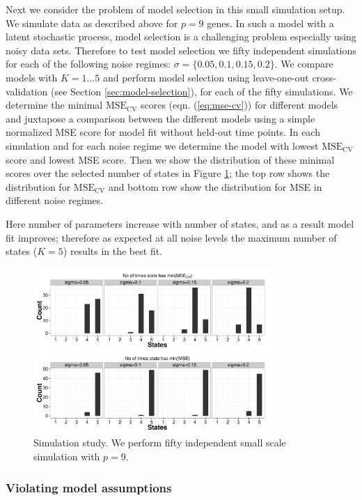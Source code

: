 Next we consider the problem of model selection in this small simulation setup. We simulate data as described above for $p=9$ genes. In such a model with a latent stochastic process, model selection is a challenging problem especially using noisy data sets. Therefore to test model selection we fifty independent simulations for each of the following noise regimes: $\sigma = \lbrace 0.05, 0.1, 0.15, 0.2 \rbrace $. We compare models with $K = 1 \ldots 5$ and perform model selection using leave-one-out cross-validation (see Section \ref{sec:model-selection}), for each of the fifty simulations. We determine the minimal $\mathrm{MSE_{CV}}$ scores (eqn. (\ref{eq:mse-cv})) for different models and juxtapose a comparison between the different models using a simple normalized MSE score for model fit without held-out time points. In each simulation and for each noise regime we determine the model with lowest $\mathrm{MSE_{CV}}$ score and lowest MSE score. Then we show the distribution of these minimal scores over the selected number of states in Figure \ref{fig:small-scale-modelSlct}; the top row shows the distribution for $\mathrm{MSE_{CV}}$ and bottom row show the distribution for MSE in different noise regimes. 

Here number of parameters increase with number of states, and as a result model fit improves; therefore as expected at all noise levels the maximum number of states ($K=5$) results in the best fit. 

\begin{figure}
  \centering
  \includegraphics[width=0.8\textwidth]{pics/hist-all.pdf}
  \caption{Simulation study. We perform fifty independent small scale simulation with $p=9$. }
  \label{fig:small-scale-modelSlct}
\end{figure}

\subsubsection{Violating model assumptions}
\label{sec:viol-model-assumpt}

